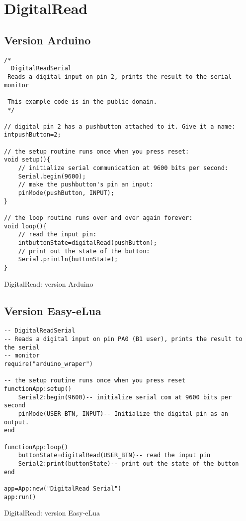\newpage
\section{DigitalRead}

\subsection{Version Arduino}

\begin{table}[h]
\begin{lstlisting}
/*
  DigitalReadSerial
 Reads a digital input on pin 2, prints the result to the serial monitor 

 This example code is in the public domain.
 */

// digital pin 2 has a pushbutton attached to it. Give it a name:
intpushButton=2;

// the setup routine runs once when you press reset:
void setup(){
    // initialize serial communication at 9600 bits per second:
    Serial.begin(9600);
    // make the pushbutton's pin an input:
    pinMode(pushButton, INPUT);
}

// the loop routine runs over and over again forever:
void loop(){
    // read the input pin:
    intbuttonState=digitalRead(pushButton);
    // print out the state of the button:
    Serial.println(buttonState);
}
\end{lstlisting}
\caption{DigitalRead: version Arduino}
\end{table}
\newpage
\subsection{Version Easy-eLua}

\begin{table}[h]
\begin{lstlisting}
-- DigitalReadSerial
-- Reads a digital input on pin PA0 (B1 user), prints the result to the serial
-- monitor
require("arduino_wraper")

-- the setup routine runs once when you press reset
functionApp:setup()
    Serial2:begin(9600)-- initialize serial com at 9600 bits per second
    pinMode(USER_BTN, INPUT)-- Initialize the digital pin as an output.
end

functionApp:loop()
    buttonState=digitalRead(USER_BTN)-- read the input pin
    Serial2:print(buttonState)-- print out the state of the button
end

app=App:new("DigitalRead Serial")
app:run()
\end{lstlisting}
\caption{DigitalRead: version Easy-eLua}
\end{table}